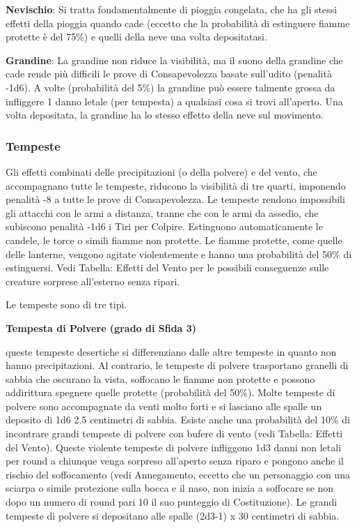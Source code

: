 \begin{multicols}{2}
\textbf{Nevischio}: Si tratta fondamentalmente di pioggia congelata, che ha gli stessi effetti della pioggia quando cade (eccetto che la probabilità di estinguere fiamme protette è del 75\%) e quelli della neve una volta depositatasi.

\textbf{Grandine}: La grandine non riduce la visibilità, ma il suono della grandine che cade rende più difficili le prove di Consapevolezza basate sull'udito (penalità -1d6). A volte (probabilità del 5\%) la grandine può essere talmente grossa da infliggere 1 danno letale (per tempesta) a qualsiasi cosa si trovi all'aperto. Una volta depositata, la grandine ha lo stesso effetto della neve sul movimento.

\subsubsection{Tempeste}

\label{tempeste}

Gli effetti combinati delle precipitazioni (o della polvere) e del vento, che accompagnano tutte le tempeste, riducono la visibilità di tre quarti, imponendo penalità -8 a tutte le prove di Consapevolezza. Le tempeste rendono impossibili gli attacchi con le armi a distanza, tranne che con le armi da assedio, che subiscono penalità -1d6 i Tiri per Colpire.
Estinguono automaticamente le candele, le torce o simili fiamme non protette. Le fiamme protette, come quelle delle lanterne, vengono agitate violentemente e hanno una probabilità del 50\% di estinguersi. Vedi Tabella: Effetti del Vento per le possibili conseguenze sulle creature sorprese all'esterno senza ripari.

Le tempeste sono di tre tipi.

\textbf{Tempesta di Polvere (grado di Sfida 3)}

queste tempeste desertiche si differenziano dalle altre tempeste in quanto non hanno precipitazioni. Al contrario, le tempeste di polvere trasportano granelli di sabbia che oscurano la vista, soffocano le fiamme non protette e possono addirittura spegnere quelle protette (probabilità del 50\%). Molte tempeste di polvere sono accompagnate da venti molto forti e si lasciano alle spalle un deposito di 1d6 \texttimes{} 2.5 centimetri di sabbia.
Esiste anche una probabilità del 10\% di incontrare grandi tempeste di polvere con bufere di vento (vedi Tabella: Effetti del Vento). Queste violente tempeste di polvere infliggono 1d3 danni non letali per round a chiunque venga sorpreso all'aperto senza riparo e pongono anche il rischio del soffocamento (vedi Annegamento, eccetto che un personaggio con una sciarpa o simile protezione sulla bocca e il naso, non inizia a soffocare se non dopo un numero di round pari 10 \texttimes{} il suo punteggio di Costituzione). Le grandi tempeste di polvere si depositano alle spalle (2d3-1) x 30 centimetri di sabbia.


\end{multicols}
